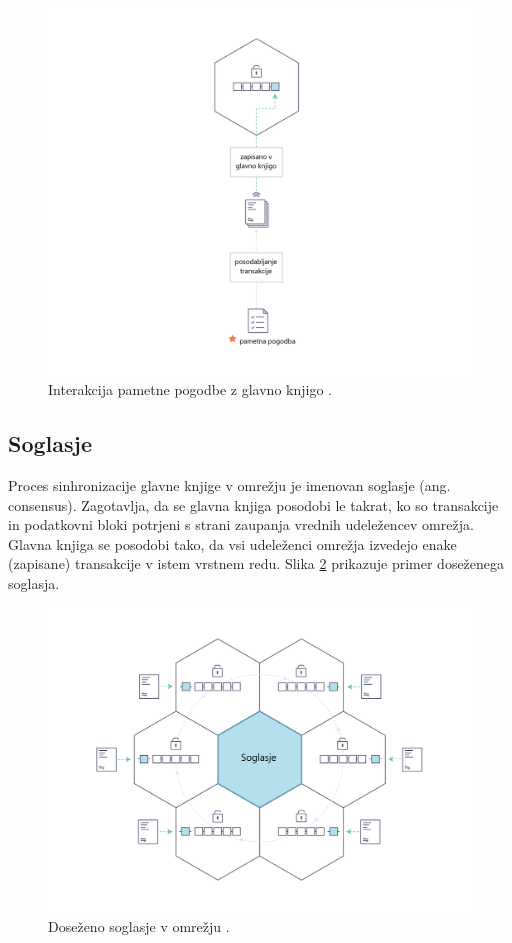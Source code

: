 \documentclass[a4paper, 12pt]{book}
\begin{document}
\begin{figure}[h]
	\includegraphics[width=1.0\textwidth]{slike/Smart_Contract_sl.png}
	\caption{Interakcija pametne pogodbe z glavno knjigo \cite{hyperledgerDocs}.}
	\label{smart_contract}
\end{figure}


\subsection{Soglasje}
Proces sinhronizacije glavne knjige v omrežju je imenovan soglasje (ang. consensus).
Zagotavlja, da se glavna knjiga posodobi le takrat, ko so transakcije in podatkovni bloki potrjeni s strani zaupanja vrednih udeležencev omrežja.
Glavna knjiga se posodobi tako, da vsi udeleženci omrežja izvedejo enake (zapisane) transakcije v istem vrstnem redu.
Slika \ref{consensus} prikazuje primer doseženega soglasja.

\begin{figure}[h]
	\includegraphics[width=1.0\textwidth]{slike/consensus.png}
	\caption{Doseženo soglasje v omrežju \cite{hyperledgerDocs}.}
	\label{consensus}
\end{figure}
\end{document}
